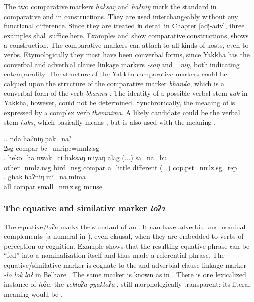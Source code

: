   The two comparative markers \emph{haksaŋ} and \emph{haʔniŋ} mark the standard in comparative and in  constructions. They are used interchangeably without any functional difference. Since they are treated in detail in Chapter \ref{adj-adv}, three examples shall suffice here. Examples \Next[a] and \Next[b] show comparative constructions, \Next[c] shows a  construction. The comparative markers can attach to all kinds of hosts, even to verbs. Etymologically they must have been converbal forms, since Yakkha has the converbal and adverbial clause linkage markers \emph{-saŋ} and \emph{=niŋ}, both indicating cotemporality. The structure of the Yakkha comparative markers could be calqued upon the structure of the   comparative marker \emph{bhanda}, which is a converbal form of the verb \emph{bhannu} . The identity of a possible verbal stem \emph{hak} in Yakkha, however, could not be determined. Synchronically, the meaning of  is expressed by a complex verb \emph{themnima}. A likely candidate could be the verbal stem \emph{haks}, which basically means , but is also used with the meaning .
  
  
\ex.\ag. nda haʔniŋ pak=na?\\
		2sg  {\sc compar}	be\_unripe{\sc =nmlz.sg}\\
\bg. heko=ha nwak=ci haksaŋ miyaŋ alag (...) sa=na=bu\\
	other{\sc =nmlz.nsg} bird{\sc =nsg} {\sc compar}  a\_little different (...) {\sc cop.pst=nmlz.sg=rep}\\
	 
\bg. ghak haʔniŋ mi=na  mima\\
	all {\sc compar} small{\sc =nmlz.sg} mouse\\
 
  

\subsubsection{The equative and similative marker \emph{loʔa}}
  
  The equative/\emph{loʔa} marks the standard of an . It can have adverbial \Next[a] and nominal  complements  (a numeral in \Next[b]), even clausal, when they are embedded to verbs of perception or cognition. Example \Next[c] shows that the resulting equative phrase  can be “fed”  into a nominalization itself and thus made a referential phrase. The equative/similative marker is cognate to the  and adverbial clause linkage marker \emph{-lo \ti lok \ti loʔ} in Belhare  \citep{Bickel1993Belhare}. The same marker is known as  in   \citep{Doornenbal2009A-grammar}.  There is one lexicalized instance of  \emph{loʔa}, the   \emph{pekloʔa \ti pyakloʔa} , still morphologically transparent: its literal meaning would be .
 
